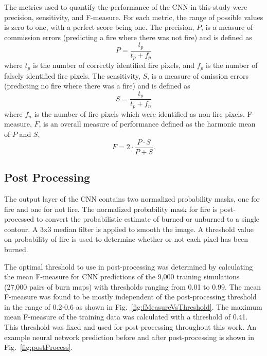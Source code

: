 \documentclass[smallcondensed]{svjour3}     %
\begin{document}
The metrics used to quantify the performance of the CNN in this study
were precision, sensitivity, and F-measure. For each metric, the range
of possible values is zero to one, with a perfect score being one.
The precision, $P$, is a measure of commission errors (predicting a
fire where there was not fire) and is defined as
\begin{equation}
P = \frac{t_{p}}{t_{p}+f_{p}}
\label{eq:precision}
\end{equation}
where $t_{p}$ is the number of correctly identified fire pixels, and
$f_{p}$ is the number of falsely identified fire pixels.
The sensitivity, $S$, is a measure of omission errors (predicting no fire where there was a fire) and is defined as
\begin{equation}
S = \frac{t_{p}}{t_{p}+f_{n}}
\label{eq:sensitivity}
\end{equation}
where $f_{n}$ is the number of fire pixels which were identified
as non-fire pixels.
F-measure, $F$, is an overall measure of performance defined
as the harmonic mean of $P$ and $S$,
\begin{equation}
F = 2\cdot\frac{P\cdot S}{P+S}.
\label{eq:fmeasure}
\end{equation}




\subsection{Post Processing}
\label{ss:PP}

The output layer of the CNN contains two normalized probability masks, one for
fire and one for not fire. The normalized probability mask for fire is
post-processed to convert the probabilistic estimate of burned or unburned to
a single contour. A 3x3 median filter is applied to smooth the image. A threshold value
on probability of fire is used to determine whether or not each pixel has been
burned. 

The optimal threshold to use in post-processing was determined by calculating
the mean F-measure for CNN predictions of the 9,000 training simulations (27,000
pairs of burn maps) with thresholds ranging from 0.01 to 0.99.
The mean F-measure was found to be mostly independent of the post-processing threshold
in the range of 0.2-0.6 as shown in Fig.~\ref{fig:fMeasureVsThreshold}.
The maximum mean F-measure of the training data was calculated with a threshold
of 0.41. This threshold was fixed and used for post-processing throughout
this work. An example neural network prediction before and after post-processing
is shown in Fig.~\ref{fig:postProcess}.
\end{document}
